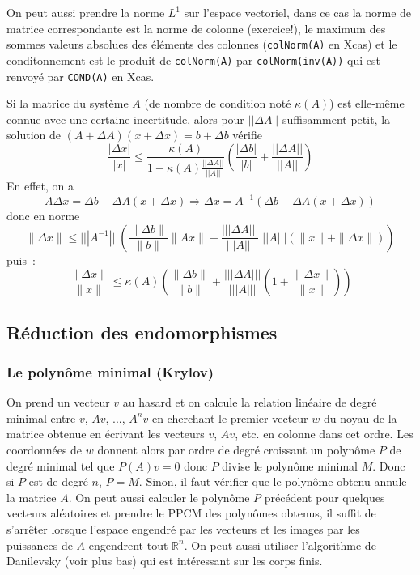 \documentclass[a4paper,11pt]{article}
\begin{document}
\begin{giacjshere}
On peut aussi prendre la norme $L^1$ sur l'espace vectoriel, dans ce
cas la norme de matrice correspondante est la norme de colonne (exercice!),
le maximum des sommes valeurs absolues des \'el\'ements
des colonnes (\verb|colNorm(A)| en Xcas) et le conditonnement
est le produit de \verb|colNorm(A)| par \verb|colNorm(inv(A))|
qui est renvoy\'e par \verb|COND(A)| en Xcas.

Si la matrice du syst\`eme $A$ (de nombre de condition not\'e
$\kappa(A)$) est elle-m\^eme connue avec une
certaine incertitude, alors pour $||\Delta A||$ suffisamment petit,
la solution de
$(A+\Delta A)(x+\Delta x)=b+\Delta b$ v\'erifie
$$ \frac {|\Delta x |}{|x|}\leq
\frac{\kappa(A)}{1-\kappa(A)\frac{||\Delta A||}{||A||}}
\left(\frac{|\Delta b|}{|b|}+\frac{||\Delta A||}{||A||}
\right) $$
En effet, on a 
$$ A \Delta x =\Delta b - \Delta A(x+\Delta x)
\Rightarrow \Delta x = A^{-1}(\Delta b - \Delta A(x+\Delta x))  $$
donc en norme
$$ \| \Delta x \| \leq |||A^{-1}||| \left(
\frac{\|\Delta b\|}{\|b\|}\|Ax\|
+ \frac{||| \Delta A |||}{|||A|||} |||A||| (\|x\|+\|\Delta x\|)
\right)$$
puis~:
$$ \frac{\| \Delta x \|}{\|x\|} \leq \kappa(A)
\left(\frac{\|\Delta b\|}{\|b\|}
+ \frac{||| \Delta A |||}{|||A|||} \left(1+\frac{\| \Delta x \|}{\|x\|}\right) 
\right)$$



\subsection{R\'eduction des endomorphismes}
\subsubsection{Le polyn\^ome minimal (Krylov)}
On prend un vecteur $v$ au hasard et on calcule la relation lin\'eaire
de degr\'e minimal entre $v$, $Av$, ..., $A^nv$ en cherchant
le premier vecteur $w$ du noyau de la matrice obtenue en écrivant
les vecteurs $v$, $Av$, etc. en colonne dans cet ordre. Les
coordonnées de $w$ donnent alors par ordre de degré croissant
un polynôme $P$ de degr\'e minimal tel que $P(A)v=0$ donc
$P$ divise le polynôme minimal $M$. Donc si $P$ est de
degré $n$, $P=M$. Sinon, il faut v\'erifier que le polynôme obtenu 
annule la matrice $A$. On peut aussi calculer le polynôme $P$
précédent pour quelques vecteurs aléatoires et prendre le PPCM des
polynômes obtenus, il suffit de s'arr\^eter lorsque l'espace engendr\'e
par les vecteurs et les images par les puissances de $A$ engendrent
tout $\mathbb{R}^n$. On peut aussi utiliser l'algorithme de Danilevsky (voir
plus bas) qui est int\'eressant sur les corps finis.


\end{giacjshere}
\end{document}
